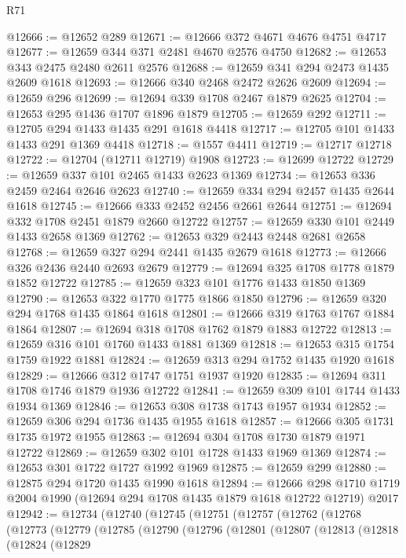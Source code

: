 \begin{lexlean}{R71}
\begin{coremodule}
@12666 := @12652 @289
@12671 := @12666 @372 @4671 @4676 @4751 @4717
@12677 := @12659 @344 @371 @2481 @4670 @2576 @4750
@12682 := @12653 @343 @2475 @2480 @2611 @2576
@12688 := @12659 @341 @294 @2473 @1435 @2609 @1618
@12693 := @12666 @340 @2468 @2472 @2626 @2609
@12694 := @12659 @296
@12699 := @12694 @339 @1708 @2467 @1879 @2625
@12704 := @12653 @295 @1436 @1707 @1896 @1879
@12705 := @12659 @292
@12711 := @12705 @294 @1433 @1435 @291 @1618 @4418
@12717 := @12705 @101 @1433 @1433 @291 @1369 @4418
@12718 := @1557 @4411
@12719 := @12717 @12718
@12722 := @12704 (@12711 @12719) @1908
@12723 := @12699 @12722
@12729 := @12659 @337 @101 @2465 @1433 @2623 @1369
@12734 := @12653 @336 @2459 @2464 @2646 @2623
@12740 := @12659 @334 @294 @2457 @1435 @2644 @1618
@12745 := @12666 @333 @2452 @2456 @2661 @2644
@12751 := @12694 @332 @1708 @2451 @1879 @2660 @12722
@12757 := @12659 @330 @101 @2449 @1433 @2658 @1369
@12762 := @12653 @329 @2443 @2448 @2681 @2658
@12768 := @12659 @327 @294 @2441 @1435 @2679 @1618
@12773 := @12666 @326 @2436 @2440 @2693 @2679
@12779 := @12694 @325 @1708 @1778 @1879 @1852 @12722
@12785 := @12659 @323 @101 @1776 @1433 @1850 @1369
@12790 := @12653 @322 @1770 @1775 @1866 @1850
@12796 := @12659 @320 @294 @1768 @1435 @1864 @1618
@12801 := @12666 @319 @1763 @1767 @1884 @1864
@12807 := @12694 @318 @1708 @1762 @1879 @1883 @12722
@12813 := @12659 @316 @101 @1760 @1433 @1881 @1369
@12818 := @12653 @315 @1754 @1759 @1922 @1881
@12824 := @12659 @313 @294 @1752 @1435 @1920 @1618
@12829 := @12666 @312 @1747 @1751 @1937 @1920
@12835 := @12694 @311 @1708 @1746 @1879 @1936 @12722
@12841 := @12659 @309 @101 @1744 @1433 @1934 @1369
@12846 := @12653 @308 @1738 @1743 @1957 @1934
@12852 := @12659 @306 @294 @1736 @1435 @1955 @1618
@12857 := @12666 @305 @1731 @1735 @1972 @1955
@12863 := @12694 @304 @1708 @1730 @1879 @1971 @12722
@12869 := @12659 @302 @101 @1728 @1433 @1969 @1369
@12874 := @12653 @301 @1722 @1727 @1992 @1969
@12875 := @12659 @299
@12880 := @12875 @294 @1720 @1435 @1990 @1618
@12894 := @12666
    @298
    @1710
    @1719
    @2004
    @1990
    (@12694 @294 @1708 @1435 @1879 @1618 @12722 @12719)
    @2017
@12942 := @12734
    (@12740
      (@12745
        (@12751
          (@12757
            (@12762
              (@12768
                (@12773
                  (@12779
                    (@12785
                      (@12790
                        (@12796
                          (@12801
                            (@12807
                              (@12813
                                (@12818
                                  (@12824
                                    (@12829

\end{coremodule}
\end{lexlean}
